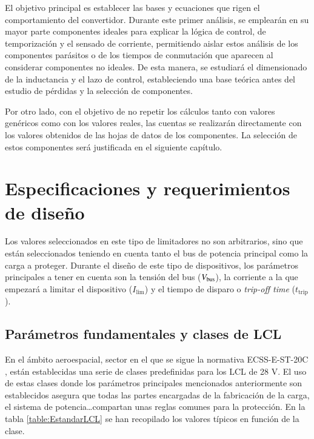 \documentclass[12pt]{report} %
\begin{document}
El objetivo principal es establecer las bases y ecuaciones que rigen el comportamiento del convertidor. Durante este primer análisis, se emplearán en su mayor parte componentes ideales para explicar la lógica de control, de temporización y el sensado de corriente, permitiendo aislar estos análisis de los componentes parásitos o de los tiempos de conmutación que aparecen al considerar componentes no ideales. De esta manera, se estudiará el dimensionado de la inductancia y el lazo de control, estableciendo una base teórica antes del estudio de pérdidas y la selección de componentes. 

Por otro lado, con el objetivo de no repetir los cálculos tanto con valores genéricos como con los valores reales, las cuentas se realizarán directamente con los valores obtenidos de las hojas de datos de los componentes. La selección de estos componentes será justificada en el siguiente capítulo. 
\section{Especificaciones y requerimientos de diseño}
\label{secc: Especificaciones y requerimientos de diseño}
Los valores seleccionados en este tipo de limitadores no son arbitrarios, sino que están seleccionados teniendo en cuenta tanto el bus de potencia principal como la carga a proteger. Durante el diseño de este tipo de dispositivos, los parámetros principales a tener en cuenta son la tensión del bus ($V_{\text{bus}}$), la corriente a la que empezará a limitar el dispositivo ($I_\text{lim}$) y el tiempo de disparo o \textit{trip-off time} ($t_\text{trip}$). 
\subsection{Parámetros fundamentales y clases de LCL}

En el ámbito aeroespacial, sector en el que se sigue la normativa ECSS-E-ST-20C \cite{european_space_agency_ecss-e-st-20c_2022}, están establecidas una serie de clases predefinidas para los LCL de 28 V. El uso de estas clases donde los parámetros principales mencionados anteriormente son establecidos asegura que todas las partes encargadas de la fabricación de la carga, el sistema de potencia\dots compartan unas reglas comunes para la protección. En la tabla \ref{table:EstandarLCL} se han recopilado los valores típicos en función de la clase. 
\end{document}
